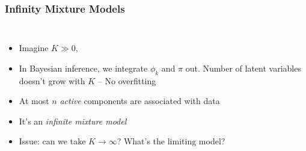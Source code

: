 \documentclass{beamer}
\begin{document}
\begin{frame}
	\frametitle{Infinity Mixture Models}	
\begin{columns}
	\begin{itemize}
		\item Imagine $K\gg 0$, 
		\item In Bayesian inference, we integrate $\phi_k$ and $\pi$ out. Number of latent variables doesn't grow with $K$ -- No overfitting
		\item At most $n$ {\em active} components are associated with data
		\item It's an {\em infinite mixture model}
		\item Issue: can we take $K \rightarrow \infty$? What's the limiting model?
	\end{itemize}
	\centering
\end{columns}
\end{frame}
\end{document}
